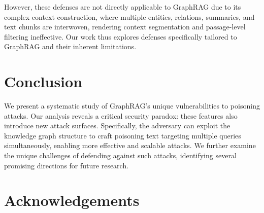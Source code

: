 However, these defenses are not directly applicable to GraphRAG due to its complex context construction, where multiple entities, relations, summaries, and text chunks are interwoven, rendering context segmentation and passage-level filtering ineffective. Our work thus explores defenses specifically tailored to GraphRAG and their inherent limitations.



\section{Conclusion}



We present a systematic study of GraphRAG's unique vulnerabilities to poisoning attacks. Our analysis reveals a critical security paradox:  these features also introduce new attack surfaces. Specifically, the adversary can exploit the knowledge graph structure to craft poisoning text targeting multiple queries simultaneously, enabling more effective and scalable attacks. We further examine the unique challenges of defending against such attacks, identifying several promising directions for future research.


\section*{Acknowledgements}
